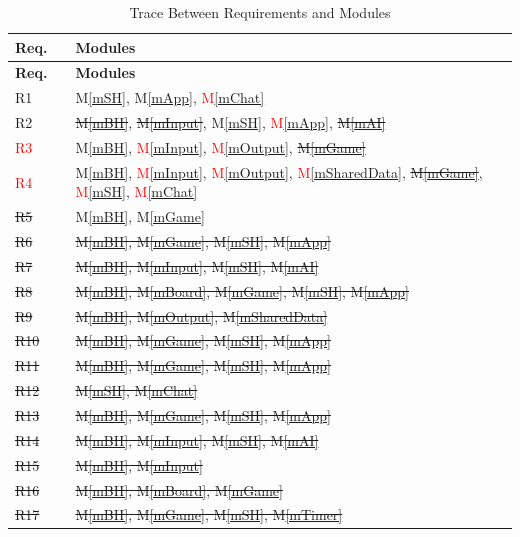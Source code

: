 \documentclass[12pt, titlepage]{article}
\newcommand{\mref}[1]{M\ref{#1}}
\begin{document}
\begin{center}
    \begin{longtable}{l l l}
        \caption{Trace Between Requirements and Modules} \\
        
        \hline \multicolumn{1}{c}{\textbf{Req.}} & \multicolumn{1}{c}{} & \multicolumn{1}{l}{\textbf{Modules}} \\ \hline 
        \endfirsthead
        
        \multicolumn{1}{c}{\textbf{Req.}} & \multicolumn{1}{c}{} & \multicolumn{1}{l}{\textbf{Modules}} \\ \hline 
        \endhead
        
        \hline \hline
        \endlastfoot
        
        R1 && \mref{mSH}, \mref{mApp}, \textcolor{red}{\mref{mChat}}\\
        R2 && \sout{\mref{mBH}}, \sout{\mref{mInput}}, \mref{mSH}, \textcolor{red}{\mref{mApp}}, \sout{\mref{mAI}} \\
        
        \textcolor{red}{R3} && \mref{mBH}, \textcolor{red}{\mref{mInput}}, \textcolor{red}{\mref{mOutput}}, \sout{\mref{mGame}}\\
        
        \textcolor{red}{R4} && \mref{mBH}, \textcolor{red}{\mref{mInput}}, \textcolor{red}{\mref{mOutput}}, \textcolor{red}{\mref{mSharedData}}, \sout{\mref{mGame}}, \textcolor{red}{\mref{mSH}}, \textcolor{red}{\mref{mChat}}\\
        
        \sout{R5} && \mref{mBH}, \mref{mGame}\\
        \sout{R6} && \sout{\mref{mBH}, \mref{mGame}, \mref{mSH}, \mref{mApp}}\\
        \sout{R7} && \sout{\mref{mBH}, \mref{mInput}, \mref{mSH}, \mref{mAI}}\\
        \sout{R8} && \sout{\mref{mBH}, \mref{mBoard}, \mref{mGame}, \mref{mSH}, \mref{mApp}}\\
        \sout{R9} && \sout{\mref{mBH}, \mref{mOutput}, \mref{mSharedData}}\\
        \sout{R10} && \sout{\mref{mBH}, \mref{mGame}, \mref{mSH}, \mref{mApp}}\\
        \sout{R11} && \sout{\mref{mBH}, \mref{mGame}, \mref{mSH}, \mref{mApp}}\\
        \sout{R12} && \sout{\mref{mSH}, \mref{mChat}}\\
        \sout{R13} && \sout{\mref{mBH}, \mref{mGame}, \mref{mSH}, \mref{mApp}}\\
        \sout{R14} && \sout{\mref{mBH},  \mref{mInput}, \mref{mSH}, \mref{mAI}}\\
        \sout{R15} && \sout{\mref{mBH}, \mref{mInput}} \\
        \sout{R16} && \sout{\mref{mBH}, \mref{mBoard}, \mref{mGame}}\\
        \sout{R17} && \sout{\mref{mBH}, \mref{mGame}, \mref{mSH}, \mref{mTimer}}\\
        

\end{longtable}
\end{center}
\end{document}
